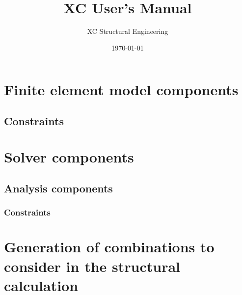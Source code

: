 \documentclass[a4paper,twoside]{book}
\title{XC User's Manual}
\author{XC Structural Engineering}
\date{\today}
\begin{document}
\maketitle
\lstset{language=Python}          %
\setcounter{secnumdepth}{4}
\setcounter{tocdepth}{4}
\tableofcontents
\listoftables


\chapter{Finite element model components}



\section{Constraints}


\chapter{Solver components}

\section{Analysis components}
\subsection{Constraints}








%



\appendix
\chapter{Generation of combinations to consider in the structural calculation}



\begin{thebibliography}{77}	%

\small				%

\end{thebibliography}
\end{document}
